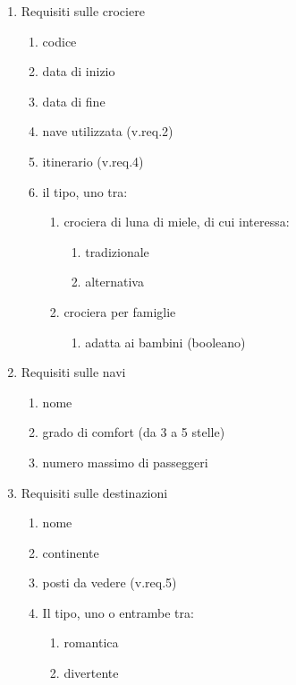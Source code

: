 \documentclass{article}
\begin{document}
\begin{enumerate}
    \item Requisiti sulle crociere
    \begin{enumerate}
        \item codice
        \item data di inizio
        \item data di fine
        \item nave utilizzata (v.req.2)
        \item itinerario (v.req.4)
        \item il tipo, uno tra:
        \begin{enumerate}
            \item crociera di luna di miele, di cui interessa:
            \begin{enumerate}
                \item tradizionale
                \item alternativa
            \end{enumerate}
            \item crociera per famiglie
            \begin{enumerate}
                \item adatta ai bambini (booleano)
            \end{enumerate}
        \end{enumerate}
    \end{enumerate}
    \item Requisiti sulle navi
    \begin{enumerate}
        \item nome
        \item grado di comfort (da 3 a 5 stelle)
        \item numero massimo di passeggeri
    \end{enumerate}
    \item Requisiti sulle destinazioni
    \begin{enumerate}
        \item nome
        \item continente
        \item posti da vedere (v.req.5)
        \item Il tipo, uno o entrambe tra:
        \begin{enumerate}
            \item romantica
            \item divertente
        \end{enumerate}

\end{enumerate}
\end{enumerate}
\end{document}
